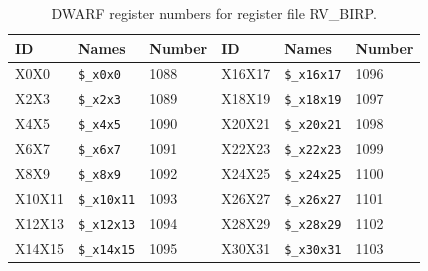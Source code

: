 \begin{table}
\begin{center}
{\small
\begin{tabular}{|l|l|l||l|l|l|} \hline
ID & Names & Number & ID & Names & Number \\ \hline
X0X0 & \verb|$_x0x0| & 1088 &
X16X17 & \verb|$_x16x17| & 1096 \\
X2X3 & \verb|$_x2x3| & 1089 &
X18X19 & \verb|$_x18x19| & 1097 \\
X4X5 & \verb|$_x4x5| & 1090 &
X20X21 & \verb|$_x20x21| & 1098 \\
X6X7 & \verb|$_x6x7| & 1091 &
X22X23 & \verb|$_x22x23| & 1099 \\
X8X9 & \verb|$_x8x9| & 1092 &
X24X25 & \verb|$_x24x25| & 1100 \\
X10X11 & \verb|$_x10x11| & 1093 &
X26X27 & \verb|$_x26x27| & 1101 \\
X12X13 & \verb|$_x12x13| & 1094 &
X28X29 & \verb|$_x28x29| & 1102 \\
X14X15 & \verb|$_x14x15| & 1095 &
X30X31 & \verb|$_x30x31| & 1103 \\
\hline \end{tabular}
}
\end{center}
\caption{DWARF register numbers for register file RV_BIRP.}
\label{table:DwarfId-RV_BIRP}
\end{table}

